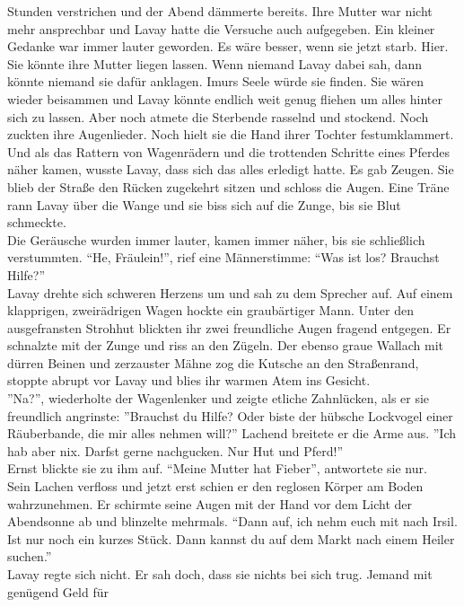 Stunden verstrichen und der Abend dämmerte bereits. Ihre Mutter war nicht mehr ansprechbar und 
Lavay hatte die Versuche auch aufgegeben. Ein kleiner Gedanke war immer lauter geworden. Es 
wäre besser, wenn sie jetzt starb. Hier. Sie könnte ihre Mutter liegen lassen. Wenn niemand Lavay 
dabei sah, dann könnte niemand sie dafür anklagen. Imurs Seele würde sie finden. Sie wären wieder 
beisammen und Lavay könnte endlich weit genug fliehen um alles hinter sich zu lassen. Aber noch 
atmete die Sterbende rasselnd und stockend. Noch zuckten ihre Augenlieder. Noch hielt sie die Hand 
ihrer Tochter festumklammert.\\
Und als das Rattern von Wagenrädern und die trottenden Schritte eines Pferdes näher kamen, wusste 
Lavay, dass sich das alles erledigt hatte. Es gab Zeugen. Sie blieb der Straße den Rücken zugekehrt 
sitzen und schloss die Augen. Eine Träne rann Lavay über die Wange und sie biss sich auf die 
Zunge, bis sie Blut schmeckte.\\
Die Geräusche wurden immer lauter, kamen immer näher, bis sie schließlich verstummten. ``He, 
Fräulein!'', rief eine Männerstimme: ``Was ist los? Brauchst Hilfe?''\\
Lavay drehte sich schweren Herzens um und sah zu dem Sprecher auf. Auf einem klapprigen, 
zweirädrigen Wagen hockte ein graubärtiger Mann. Unter den ausgefransten Strohhut blickten ihr zwei 
freundliche Augen fragend entgegen. Er schnalzte mit der Zunge und riss an den Zügeln. Der 
ebenso graue Wallach mit dürren Beinen und zerzauster Mähne zog die Kutsche an den Straßenrand, 
stoppte abrupt vor Lavay und blies ihr warmen Atem ins Gesicht.\\
''Na?'', wiederholte der Wagenlenker und zeigte etliche Zahnlücken, als er sie freundlich 
angrinste: ''Brauchst du Hilfe? Oder biste der hübsche Lockvogel einer Räuberbande, die mir alles 
nehmen will?'' Lachend breitete er die Arme aus. ''Ich hab aber nix. Darfst gerne nachgucken. Nur 
Hut und Pferd!''\\
Ernst blickte sie zu ihm auf. ``Meine Mutter hat Fieber'', antwortete sie nur.\\
Sein Lachen verfloss und jetzt erst schien er den reglosen Körper am Boden wahrzunehmen. Er 
schirmte seine Augen mit der Hand vor dem Licht der Abendsonne ab und blinzelte mehrmals. ``Dann 
auf, ich nehm euch mit nach Irsil. Ist nur noch ein kurzes Stück. Dann kannst du auf dem Markt nach 
einem Heiler suchen.''\\
Lavay regte sich nicht. Er sah doch, dass sie nichts bei sich trug. Jemand mit genügend Geld für 

